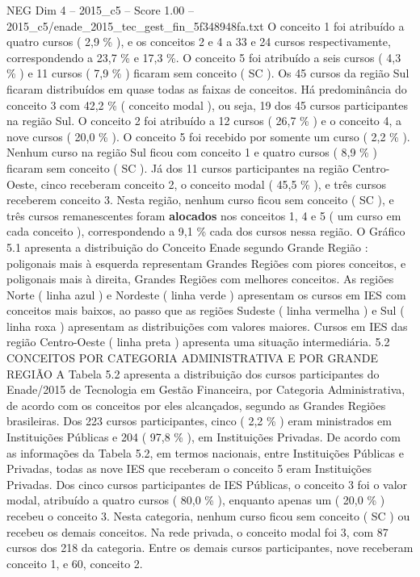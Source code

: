 \begin{textsample}{NEG Dim 4 – 2015\_c5 – Score 1.00 – 2015\_c5/enade\_2015\_tec\_gest\_fin\_5f348948fa.txt}
O conceito 1 foi atribuído a quatro cursos ( 2,9 \% ), e os conceitos 2 e 4 a 33 e 24 cursos respectivamente, correspondendo a 23,7 \% e 17,3 \%.
O conceito 5 foi atribuído a seis cursos ( 4,3 \% ) e 11 cursos ( 7,9 \% ) ficaram sem conceito ( SC ).
Os 45 cursos da região Sul ficaram distribuídos em quase todas as faixas de conceitos.
Há predominância do conceito 3 com 42,2 \% ( conceito modal ), ou seja, 19 dos 45 cursos participantes na região Sul.
O conceito 2 foi atribuído a 12 cursos ( 26,7 \% ) e o conceito 4, a nove cursos ( 20,0 \% ).
O conceito 5 foi recebido por somente um curso ( 2,2 \% ).
Nenhum curso na região Sul ficou com conceito 1 e quatro cursos ( 8,9 \% ) ficaram sem conceito ( SC ).
Já dos 11 cursos participantes na região Centro-Oeste, cinco receberam conceito 2, o conceito modal ( 45,5 \% ), e três cursos receberem conceito 3.
Nesta região, nenhum curso ficou sem conceito ( SC ), e três cursos remanescentes foram \textbf{alocados} nos conceitos 1, 4 e 5 ( um curso em cada conceito ), correspondendo a 9,1 \% cada dos cursos nessa região.
O Gráfico 5.1 apresenta a distribuição do Conceito Enade segundo Grande Região : poligonais mais à esquerda representam Grandes Regiões com piores conceitos, e poligonais mais à direita, Grandes Regiões com melhores conceitos.
As regiões Norte ( linha azul ) e Nordeste ( linha verde ) apresentam os cursos em IES com conceitos mais baixos, ao passo que as regiões Sudeste ( linha vermelha ) e Sul ( linha roxa ) apresentam as distribuições com valores maiores.
Cursos em IES das região Centro-Oeste ( linha preta ) apresenta uma situação intermediária. 5.2 CONCEITOS POR CATEGORIA ADMINISTRATIVA E POR GRANDE REGIÃO A Tabela 5.2 apresenta a distribuição dos cursos participantes do Enade/2015 de Tecnologia em Gestão Financeira, por Categoria Administrativa, de acordo com os conceitos por eles alcançados, segundo as Grandes Regiões brasileiras.
Dos 223 cursos participantes, cinco ( 2,2 \% ) eram ministrados em Instituições Públicas e 204 ( 97,8 \% ), em Instituições Privadas.
De acordo com as informações da Tabela 5.2, em termos nacionais, entre Instituições Públicas e Privadas, todas as nove IES que receberam o conceito 5 eram Instituições Privadas.
Dos cinco cursos participantes de IES Públicas, o conceito 3 foi o valor modal, atribuído a quatro cursos ( 80,0 \% ), enquanto apenas um ( 20,0 \% ) recebeu o conceito 3.
Nesta categoria, nenhum curso ficou sem conceito ( SC ) ou recebeu os demais conceitos.
Na rede privada, o conceito modal foi 3, com 87 cursos dos 218 da categoria.
Entre os demais cursos participantes, nove receberam conceito 1, e 60, conceito 2.

\end{textsample}
